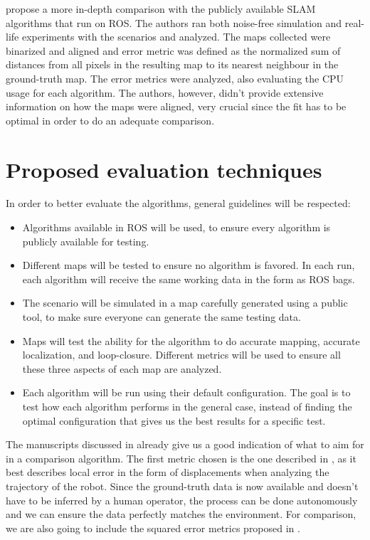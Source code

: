  \citeauthor{santos2013evaluation} propose a more in-depth comparison with the publicly available SLAM algorithms that run on ROS. The authors ran both noise-free simulation and real-life experiments with the scenarios and analyzed. The maps collected were binarized and aligned and error metric was defined as the normalized sum of distances from all pixels in the resulting map to its nearest neighbour in the ground-truth map. The error metrics were analyzed, also evaluating the CPU usage for each algorithm. The authors, however, didn't provide extensive information on how the maps were aligned, very crucial since the fit has to be optimal in order to do an adequate comparison.
 
 \section{Proposed evaluation techniques} \label{sec:proposed-evaluation}
 
 In order to better evaluate the algorithms, general guidelines will be respected:
 
 \begin{itemize}
     \item Algorithms available in ROS will be used, to ensure every algorithm is publicly available for testing.
     \item Different maps will be tested to ensure no algorithm is favored. In each run, each algorithm will receive the same working data in the form as ROS bags.
     \item The scenario will be simulated in a map carefully generated using a public tool, to make sure everyone can generate the same testing data.
     \item Maps will test the ability for the algorithm to do accurate mapping, accurate localization, and loop-closure. Different metrics will be used to ensure all these three aspects of each map are analyzed.
     \item Each algorithm will be run using their default configuration. The goal is to test how each algorithm performs in the general case, instead of finding the optimal configuration that gives us the best results for a specific test.
 \end{itemize}
 
The manuscripts discussed in  already give us a good indication of what to aim for in a comparison algorithm. The first metric chosen is the one described in \cite{kummerle2009measuring}, as it best describes local error in the form of displacements when analyzing the trajectory of the robot. Since the ground-truth data is now available and doesn't have to be inferred by a human operator, the process can be done autonomously and we can ensure the data perfectly matches the environment. For comparison, we are also going to include the squared error metrics proposed in .

